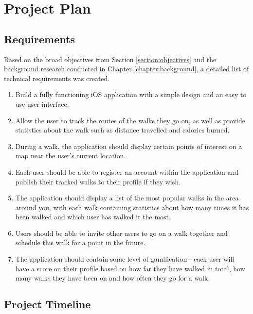 \chapter{Project Plan}

\section{Requirements} \label{section:requirements}

Based on the broad objectives from Section \ref{section:objectives} and the background research conducted in Chapter \ref{chapter:background}, a detailed list of technical requirements was created.


\begin{enumerate}[label=\textbf{Req \arabic*}]
    \item Build a fully functioning iOS application with a simple design and an easy to use user interface.
    \item Allow the user to track the routes of the walks they go on, as well as provide statistics about the walk such as distance travelled and calories burned.
    \item During a walk, the application should display certain points of interest on a map near the user's current location.
    \item Each user should be able to register an account within the application and publish their tracked walks to their profile if they wish.
    \item The application should display a list of the most popular walks in the area around you, with each walk containing statistics about how many times it has been walked and which user has walked it the most.
    \item Users should be able to invite other users to go on a walk together and schedule this walk for a point in the future.
    \item The application should contain some level of gamification - each user will have a score on their profile based on how far they have walked in total, how many walks they have been on and how often they go for a walk.
\end{enumerate}

\section{Project Timeline} \label{section:project-timeline}

